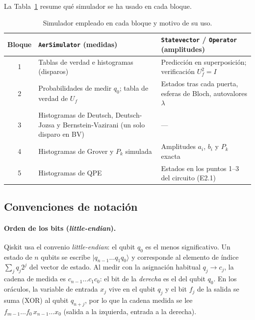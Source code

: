 La Tabla~\ref{tab:entorno_simuladores} resume qué simulador se ha usado en cada bloque.

\begin{table}[htbp]
    \centering
    \begin{tabular}{c|p{}|p{}}
    \hline
    Bloque & \texttt{AerSimulator} (medidas) & \texttt{Statevector} / \texttt{Operator} (amplitudes) \\
    \hline
    1 & Tablas de verdad e histogramas (disparos) & Predicción en superposición; verificación $U_f^2=I$ \\
    2 & Probabilidades de medir $q_0$; tabla de verdad de $U_f$ & Estados tras cada puerta, esferas de Bloch, autovalores $\lambda$ \\
    3 & Histogramas de Deutsch, Deutsch-Jozsa y Bernstein-Vazirani (un solo disparo en BV) & --- \\
    4 & Histogramas de Grover y $P_k$ simulada & Amplitudes $a_i$, $b_i$ y $P_k$ exacta \\
    5 & Histogramas de QPE & Estados en los puntos 1--3 del circuito (E2.1) \\
    \hline
    \end{tabular}
    \caption{Simulador empleado en cada bloque y motivo de su uso.}\label{tab:entorno_simuladores}
\end{table}

\subsection{Convenciones de notación}\label{subsec:convenciones}

\paragraph{Orden de los bits (\textit{little-endian}).} Qiskit usa el convenio \textit{little-endian}: el qubit $q_0$ es el menos significativo. Un estado de $n$ qubits se escribe
$|q_{n-1}\dots q_1q_0\rangle$ y corresponde al elemento de índice $\sum_j q_j2^j$ del vector de estado. Al medir con la asignación habitual $q_j\to c_j$, la cadena de
medida es $c_{n-1}\dots c_1c_0$: el bit de la \emph{derecha} es el del qubit $q_0$. En los oráculos, la variable de entrada $x_j$ vive en el qubit $q_j$ y el bit
$f_j$ de la salida se suma (XOR) al qubit $q_{n+j}$, por lo que la cadena medida se lee $f_{m-1}\dots f_0\,x_{n-1}\dots x_0$ (salida a la izquierda, entrada a la derecha).

